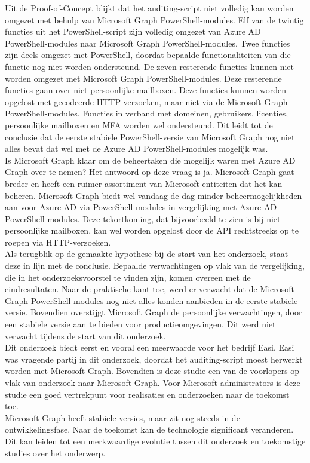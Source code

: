 Uit de Proof-of-Concept blijkt dat het auditing-script niet volledig kan worden omgezet met behulp van Microsoft Graph PowerShell-modules. Elf van de twintig functies uit het PowerShell-script zijn volledig omgezet van Azure \Ac{AD} PowerShell-modules naar Microsoft Graph PowerShell-modules. Twee functies zijn deels omgezet met PowerShell, doordat bepaalde functionaliteiten van die functie nog niet worden ondersteund. De zeven resterende functies kunnen niet worden omgezet met Microsoft Graph PowerShell-modules. Deze resterende functies gaan over niet-persoonlijke mailboxen. Deze functies kunnen worden opgelost met gecodeerde \ac{HTTP}-verzoeken, maar niet via de Microsoft Graph PowerShell-modules. Functies in verband met domeinen, gebruikers, licenties, persoonlijke mailboxen en \Ac{MFA} worden wel ondersteund. Dit leidt tot de conclusie dat de eerste stabiele PowerShell-versie van Microsoft Graph nog niet alles bevat dat wel met de Azure \Ac{AD} PowerShell-modules mogelijk was. \\ 

Is Microsoft Graph klaar om de beheertaken die mogelijk waren met Azure \Ac{AD} Graph over te nemen? Het antwoord op deze vraag is ja. Microsoft Graph gaat breder en heeft een ruimer assortiment van Microsoft-entiteiten dat het kan beheren. Microsoft Graph biedt wel vandaag de dag minder beheermogelijkheden aan voor Azure \ac{AD} via PowerShell-modules in vergelijking met Azure \Ac{AD} PowerShell-modules. Deze tekortkoming, dat bijvoorbeeld te zien is bij niet-persoonlijke mailboxen, kan wel worden opgelost door de \Ac{API} rechtstreeks op te roepen via \ac{HTTP}-verzoeken. \\

Als terugblik op de gemaakte hypothese bij de start van het onderzoek, staat deze in lijn met de conclusie. Bepaalde verwachtingen op vlak van de vergelijking, die in het onderzoeksvoorstel te vinden zijn, komen overeen met de eindresultaten. Naar de praktische kant toe, werd er verwacht dat de Microsoft Graph PowerShell-modules nog niet alles konden aanbieden in de eerste stabiele versie. Bovendien overstijgt Microsoft Graph de persoonlijke verwachtingen, door een stabiele versie aan te bieden voor productieomgevingen. Dit werd niet verwacht tijdens de start van dit onderzoek. \\

Dit onderzoek biedt eerst en vooral een meerwaarde voor het bedrijf Easi. Easi was vragende partij in dit onderzoek, doordat het auditing-script moest herwerkt worden met Microsoft Graph. Bovendien is deze studie een van de voorlopers op vlak van onderzoek naar Microsoft Graph. Voor Microsoft administrators is deze studie een goed vertrekpunt voor realisaties en onderzoeken naar de toekomst toe. \\

Microsoft Graph heeft stabiele versies, maar zit nog steeds in de ontwikkelingsfase. Naar de toekomst kan de technologie significant veranderen. Dit kan leiden tot een merkwaardige evolutie tussen dit onderzoek en toekomstige studies over het onderwerp. 
 

